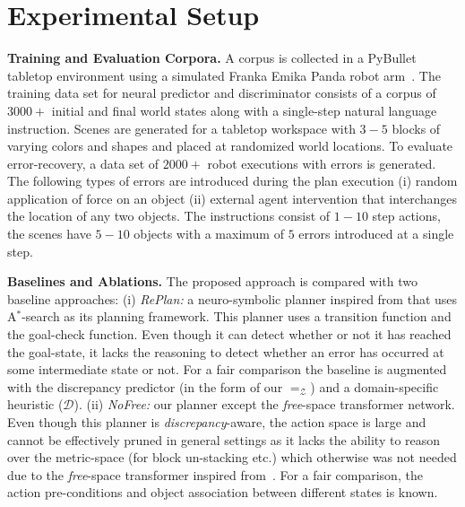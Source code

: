 \section{Experimental Setup}\label{sec:experiments}

\textbf{Training and Evaluation Corpora. } 
%
A corpus is collected in a PyBullet tabletop environment using a simulated Franka Emika Panda robot arm~\citep{haddadin2022franka}. The training data set for neural predictor and discriminator consists of a corpus of $3000+$ initial and final world states along with a single-step natural language instruction. 
%
Scenes are generated for a tabletop workspace with $3-5$ blocks of varying colors and shapes and placed at randomized world locations. 
%
To evaluate error-recovery, a data set of $2000+$ robot executions with errors is generated. The following types of errors are introduced during the plan execution (i) random application of force on an object (ii) external agent intervention that interchanges the location of any two objects. The instructions consist of $1-10$ step actions, the scenes have $5-10$ objects 
with a maximum of $5$ errors introduced at a single step.

\textbf{Baselines and Ablations. }\label{subsec:baseline}
The proposed approach is compared with two baseline approaches: (i) \emph{RePlan:} a neuro-symbolic planner inspired from \cite{mao2022pdsketch} that uses A$^*$-search as its planning framework. This planner uses a transition function and the goal-check function. Even though it can detect whether or not it has reached the goal-state, it lacks the reasoning to detect whether an error has occurred at some intermediate state or not. For a fair comparison the baseline is augmented with the discrepancy predictor (in the form of our $=_\mathcal{Z}$) and a domain-specific heuristic ($\mathcal{D}$). (ii) \emph{NoFree:} our planner except the \textit{free}-space transformer network. Even though this planner is \textit{discrepancy}-aware, the action space is large and cannot be effectively pruned in general settings as it lacks the ability to reason over the metric-space (for block un-stacking etc.) which otherwise was not needed due to the \textit{free}-space transformer inspired from~\citep{liu2022structdiffusion}. For a fair comparison, the action pre-conditions and object association between different states is known. 

